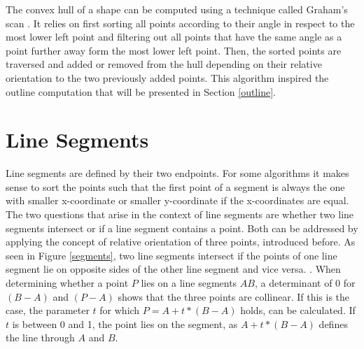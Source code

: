 The convex hull of a shape can be computed using a technique called Graham's scan \cite[Chapter~33]{cormen09}. It relies on first sorting all points according to their angle in respect to the most lower left point and filtering out all points that have the same angle as a point further away form the most lower left point. Then, the sorted points are traversed and added or removed from the hull depending on their relative orientation to the two previously added points. This algorithm inspired the outline computation that will be presented in Section \ref{outline}.
\section{Line Segments}


Line segments are defined by their two endpoints. For some algorithms it makes sense to sort the points such that the first point of a segment is always the one with smaller x-coordinate or smaller y-coordinate if the x-coordinates are equal. The two questions that arise in the context of line segments are whether two line segments intersect or if a line segment contains a point. Both can be addressed by applying the concept of relative orientation of three points, introduced before. As seen in Figure \ref{segments}, two line segments intersect if the points of one line segment lie on opposite sides of the other line segment and vice versa. \cite[Chapter~33]{cormen09}. When determining whether a point $P$ lies on a line segments $AB$, a determinant of 0 for $(B-A)$ and $(P-A)$ shows that the three points are collinear. If this is the case, the parameter $t$ for which $P = A + t*(B-A)$ holds, can be calculated. If $t$ is between 0 and 1, the point lies on the segment, as $A + t*(B-A)$ defines the line through $A$ and $B$.
